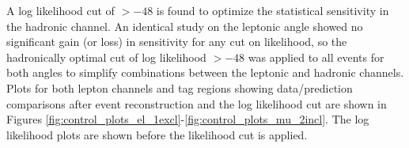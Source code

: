 A log likelihood cut of $>-48$ is found to optimize the statistical sensitivity in the hadronic channel. An identical study on the leptonic angle showed no significant gain (or loss) in sensitivity for any cut on likelihood, so the hadronically optimal cut of log likelihood $> -48$ was applied to all events for both angles to simplify combinations between the leptonic and hadronic channels. Plots for both lepton channels and \bt tag regions showing data/prediction comparisons after event reconstruction and the log likelihood cut are shown in Figures \ref{fig:control_plots_el_1excl}-\ref{fig:control_plots_mu_2incl}. The log likelihood plots are shown before the likelihood cut is applied.



